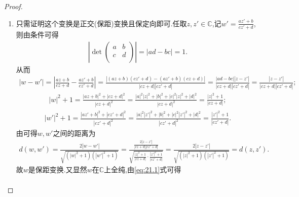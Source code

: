 \documentclass[../../main.tex]{subfiles}%
\begin{document}
\begin{proof}
\begin{enumerate}[(1)]
\item 只需证明这个变换是正交(保距)变换且保定向即可.任取$z,z'\in \mathbb{C}$,记$w'=\frac{az'+b}{cz'+d}$,则由条件可得
\begin{align}
\left| \det \left( \begin{matrix}
a& b\\
c& d\\
\end{matrix} \right) \right|=\left| ad-bc \right|=1.\label{eq:21.1}
\end{align}
从而
\begin{align*}
\left| w-w' \right|=\left| \frac{az+b}{cz+d}-\frac{az'+b}{cz'+d} \right|=\frac{\left| \left( az+b \right) \left( cz'+d \right) -\left( az'+b \right) \left( cz+d \right) \right|}{\left| cz+d \right|\left| cz'+d \right|}=\frac{\left| ad-bc \right|\left| z-z' \right|}{\left| cz+d \right|\left| cz'+d \right|}=\frac{\left| z-z' \right|}{\left| cz+d \right|\left| cz'+d \right|};
\end{align*}
\begin{align*}
\left| w \right|^2+1=\frac{\left| az+b \right|^2+\left| cz+d \right|^2}{\left| cz+d \right|^2}=\frac{\left| a \right|^2\left| z \right|^2+\left| b \right|^2+\left| c \right|^2\left| z \right|^2+\left| d \right|^2}{\left| cz+d \right|^2}=\frac{\left| z \right|^2+1}{\left| cz+d \right|};
\end{align*}
\begin{align*}
\left| w' \right|^2+1=\frac{\left| az'+b \right|^2+\left| cz'+d \right|^2}{\left| cz'+d \right|^2}=\frac{\left| a \right|^2\left| z' \right|^2+\left| b \right|^2+\left| c \right|^2\left| z' \right|^2+\left| d \right|^2}{\left| cz'+d \right|^2}=\frac{\left| z' \right|^2+1}{\left| cz'+d \right|}.
\end{align*}
由可得$w,w'$之间的距离为
\begin{align*}
d\left( w,w' \right) =\frac{2\left| w-w' \right|}{\sqrt{\left( \left| w \right|^2+1 \right) \left( \left| w' \right|^2+1 \right)}}=\frac{\frac{2\left| z-z' \right|}{\left| cz+d \right|\left| cz'+d \right|}}{\sqrt{\frac{\left| z \right|^2+1}{\left| cz+d \right|}\cdot \frac{\left| z' \right|^2+1}{\left| cz'+d \right|}}}=\frac{2\left| z-z' \right|}{\sqrt{\left( \left| z \right|^2+1 \right) \left( \left| z' \right|^2+1 \right)}}=d\left( z,z' \right) .
\end{align*}
故$w$是保距变换.又显然$w$在$\mathbb{C}$上全纯,由\eqref{eq:21.1}式可得
\begin{align*}

\end{align*}
\end{enumerate}
\end{proof}
\end{document}
